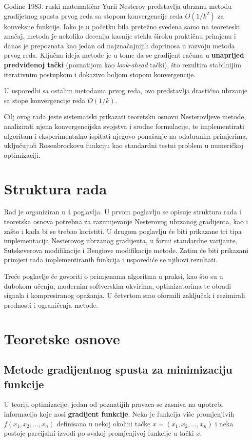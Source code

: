 Godine 1983. ruski matematičar Yurii Nesterov predstavlja ubrzanu metodu gradijetnog spusta prvog reda sa stopom konvergencije reda $O(1/k^2)$ za konveksne funkcije.
Iako je u početku bila pretežno svedena samo na teoreteski značaj, metoda je nekoliko decenija kasnije stekla široku praktičnu primjenu i danas je prepoznata kao jedan od najznačajnijih doprinosa u razvoju metoda prvog reda.
Ključna ideja metode je u tome da se gradijent računa u \textbf{unaprijed predviđenoj tački} (poznatijom kao \textit{look-ahead} tački), što rezultira stabilnijim iterativnim postupkom i dokazivo boljom stopom konvergencije.

U usporedbi sa ostalim metodama prvog reda, ovo predstavlja drastično ubrzanje sa stope konvergencije reda $O(1/k)$.

Cilj ovog rada jeste sistematski prikazati teoretsku osnovu Nesterovljeve metode, analizirati njena konvergencijska svojstva i srodne formulacije, te implementirati algoritam i eksperimentalno ispitati njegovo ponašanje na odabranim primjerima, uključujući Rosenbrockovu funkciju kao standardni testni problem u numeričkoj optimizaciji.

\section{Struktura rada}


Rad je organiziran u 4 poglavlja. U prvom poglavlju se opisuje struktura rada i teoretska osnova potrebna za razumjevanje Nesterovog ubrzanog gradijenta, kao i zašto i kada bi se trebao koristiti.
U drugom poglavlju će biti prikazane tri tipa implementacija Nesterovog ubrzanog gradijenta, u formi standardne varijante, Sutskeverova modifikacije i Bengiove modifikacije metode. Zatim će biti prikazani primjeri rada implementiranih funkcija i usporediće se njihovi rezultati.

Treće poglavlje će govoriti o primjenama algoritma u praksi, kao što su u dubokom učenju, modernim softverskim okvirima, optimizatorima te obradi signala i kompresiranog opažanja.
U četvrtom smo oformili zaključak i rezimirali prednosti i ograničenja metode.


\section{Teoretske osnove}

\subsection{Metode gradijentnog spusta za minimizaciju funkcije}
U teoriji optimizacije, jedan od poznatijih pravaca se zasniva na upotrebi informacija koje nosi \textbf{gradijent funkcije}.
Neka je funkcija više promjenjivih ${f(x_1,x_2,\dots,x_n)}$ definisana u nekoj okolini tačke
$x = \left(x_1,x_2,\ldots,x_n\right)$ i neka postoje parcijalni izvodi po svakoj promjenjivoj funkcije u tački $x$.

